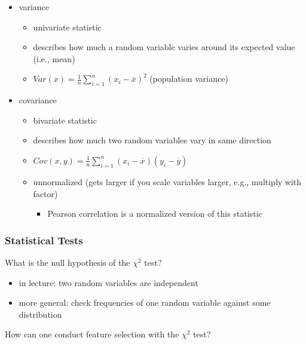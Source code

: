 \documentclass[12pt]{article}
\begin{document}
\begin{itemize}[left=0pt, nosep]
	\item variance
	\begin{itemize}[left=0pt, nosep]
		\item univariate statistic
		\item describes how much a random variable varies around its expected value (i.e., mean)
		\item $Var(x) = \frac{1}{n} \sum_{i=1}^{n} (x_i - \overline{x})^2$ (population variance)
	\end{itemize}
	\item covariance
	\begin{itemize}[left=0pt, nosep]
		\item bivariate statistic
		\item describes how much two random variables vary in same direction
		\item $Cov(x,y) = \frac{1}{n} \sum_{i=1}^{n} (x_i - \overline{x}) (y_i - \overline{y})$
		\item unnormalized (gets larger if you scale variables larger, e.g., multiply with factor)
		\begin{itemize}[left=0pt, nosep]
			\item Pearson correlation is a normalized version of this statistic
		\end{itemize}
	\end{itemize}
\end{itemize}

\subsubsection*{Statistical Tests}

\begin{question}
	What is the null hypothesis of the $\chi^2$ test?
\end{question}

\begin{itemize}[left=0pt, nosep]
	\item in lecture: two random variables are independent
	\item more general: check frequencies of one random variable against some distribution
\end{itemize}

\begin{question}
	How can one conduct feature selection with the $\chi^2$ test?
\end{question}
\end{document}
